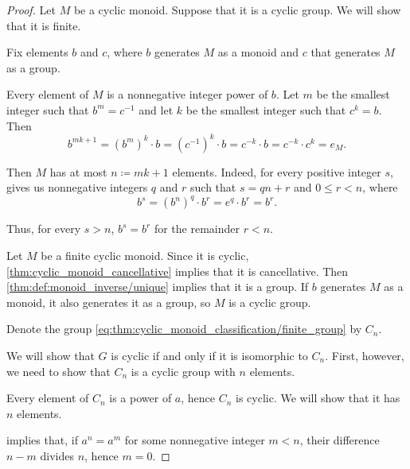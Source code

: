 \begin{proof}

  \SufficiencySubProof* Let \( M \) be a cyclic monoid. Suppose that it is a cyclic group. We will show that it is finite.

  Fix elements \( b \) and \( c \), where \( b \) generates \( M \) as a monoid and \( c \) that generates \( M \) as a group.

  Every element of \( M \) is a nonnegative integer power of \( b \). Let \( m \) be the smallest integer such that \( b^m = c^{-1} \) and let \( k \) be the smallest integer such that \( c^k = b \). Then
  \begin{equation*}
    b^{mk + 1} = (b^m)^k \cdot b = (c^{-1})^k \cdot b = c^{-k} \cdot b = c^{-k} \cdot c^k = e_M.
  \end{equation*}

  Then \( M \) has at most \( n \coloneqq mk + 1 \) elements. Indeed, for every positive integer \( s \),  gives us nonnegative integers \( q \) and \( r \) such that \( s = qn + r \) and \( 0 \leq r < n \), where
  \begin{equation*}
    b^s
    =
    (b^n)^q \cdot b^r
    =
    e^q \cdot b^r
    =
    b^r.
  \end{equation*}

  Thus, for every \( s > n \), \( b^s = b^r \) for the remainder \( r < n \).

  \NecessitySubProof* Let \( M \) be a finite cyclic monoid. Since it is cyclic, \cref{thm:cyclic_monoid_cancellative} implies that it is cancellative. Then \cref{thm:def:monoid_inverse/unique} implies that it is a group. If \( b \) generates \( M \) as a monoid, it also generates it as a group, so \( M \) is a cyclic group.

   Denote the group \eqref{eq:thm:cyclic_monoid_classification/finite_group} by \( C_n \).

  We will show that \( G \) is cyclic if and only if it is isomorphic to \( C_n \). First, however, we need to show that \( C_n \) is a cyclic group with \( n \) elements.

   Every element of \( C_n \) is a power of \( a \), hence \( C_n \) is cyclic. We will show that it has \( n \) elements.

   implies that, if \( a^n = a^m \) for some nonnegative integer \( m < n \), their difference \( n - m \) divides \( n \), hence \( m = 0 \).


\end{proof}
